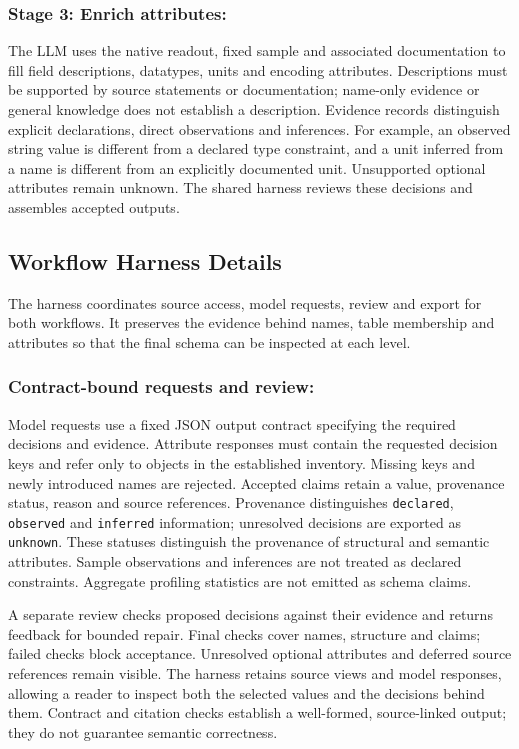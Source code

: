 \subsubsection{Stage 3: Enrich attributes:}
The LLM uses the native readout, fixed sample and associated documentation
to fill field descriptions, datatypes, units and encoding attributes.
Descriptions must be supported by source statements or documentation;
name-only evidence or general knowledge does not establish a description.
Evidence records
distinguish explicit declarations, direct observations and inferences.
For example, an observed string value is different from a declared type
constraint, and a unit inferred from a name is different from an explicitly
documented unit. Unsupported optional attributes remain unknown. The shared
harness reviews these decisions and assembles accepted outputs.

\subsection{Workflow Harness Details}
\label{sec:workflow-harness}

The harness coordinates source access, model requests, review and export
for both workflows. It preserves the evidence behind names, table membership
and attributes so that the final schema can be inspected at each level.

\subsubsection{Contract-bound requests and review:}
Model requests use a fixed JSON output contract specifying the required
decisions and evidence. Attribute responses must contain
the requested decision keys and refer only to objects in the established
inventory. Missing keys and newly introduced names are rejected. Accepted
claims retain a value, provenance status, reason and source references.
Provenance distinguishes \texttt{declared}, \texttt{observed} and
\texttt{inferred} information; unresolved decisions are exported as
\texttt{unknown}. These statuses distinguish the provenance of structural
and semantic attributes. Sample observations and inferences are not treated
as declared constraints. Aggregate profiling statistics are not emitted as
schema claims.

A separate review checks proposed decisions against their evidence and
returns feedback for bounded repair. Final checks cover names, structure and
claims; failed checks block acceptance. Unresolved optional attributes and
deferred source references remain visible. The harness retains source views
and model responses, allowing a reader to inspect both the selected values
and the decisions behind them. Contract and citation checks establish a
well-formed, source-linked output; they do not guarantee semantic correctness.

